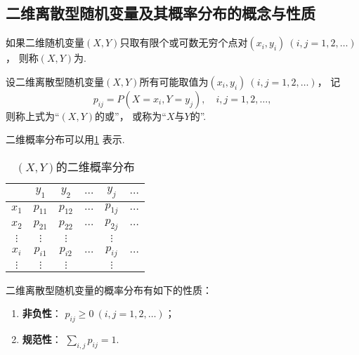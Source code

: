 \subsection{二维离散型随机变量及其概率分布的概念与性质}
\begin{definition}
如果二维随机变量\((X,Y)\)只取有限个或可数无穷个点对\((x_i,y_i)\ (i,j=1,2,\dotsc)\)，
则称\((X,Y)\)为.
\end{definition}

\begin{definition}
设二维离散型随机变量\((X,Y)\)所有可能取值为\((x_i,y_i)\ (i,j=1,2,\dotsc)\)，
记\[
	p_{ij} = P(X = x_i, Y = y_j), \quad i,j = 1,2,\dotsc,
\]
则称上式为“\((X,Y)\)的或”，
或称为“\(X\)与\(Y\)的”.
\end{definition}

二维概率分布可以用\cref{table:多维随机变量及其分布.二维概率分布} 表示.

\begin{table}[ht]
	\centering
	\begin{tabular}{c|*5c}
			& \(y_1\) & \(y_2\) & \(\dots\) & \(y_j\) & \(\dots\) \\ \hline
		\(x_1\) & \(p_{11}\) & \(p_{12}\) & \(\dots\) & \(p_{1j}\) & \(\dotsc\) \\
		\(x_2\) & \(p_{21}\) & \(p_{22}\) & \(\dots\) & \(p_{2j}\) & \(\dotsc\) \\
		\(\vdots\) & \(\vdots\) & \(\vdots\) & & \(\vdots\) \\
		\(x_i\) & \(p_{i1}\) & \(p_{i2}\) & \(\dots\) & \(p_{ij}\) & \(\dotsc\) \\
		\(\vdots\) & \(\vdots\) & \(\vdots\) & & \(\vdots\) \\
	\end{tabular}
	\caption{\((X,Y)\)的二维概率分布}
	\label{table:多维随机变量及其分布.二维概率分布}
\end{table}

\begin{property}
二维离散型随机变量的概率分布有如下的性质：
\begin{enumerate}
	\item {\bf 非负性}：
	\(p_{ij} \geq 0\ (i,j=1,2,\dotsc)\)；

	\item {\bf 规范性}：
	\(\sum_{i,j} p_{ij} = 1\).
\end{enumerate}
\end{property}

